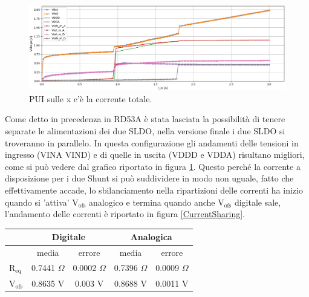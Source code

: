 \begin{figure}
\centering
\includegraphics[scale=.3]{Immagini/PUI}
\caption{PUI sulle x c'è la corrente totale.}
\label{PUI}
\end{figure}
Come detto in precedenza in RD53A è stata lasciata la possibilità di tenere separate le alimentazioni dei due SLDO, nella versione finale i due SLDO si troveranno in parallelo. 
In questa configurazione gli andamenti delle tensioni in ingresso (VINA VIND) e di quelle in uscita (VDDD e VDDA) risultano migliori, come si può vedere dal grafico riportato in figura \ref{PUI}. 
Questo perché la corrente a disposizione per i due Shunt si può suddividere in modo non uguale, fatto che effettivamente accade, lo sbilanciamento nella ripartizioni delle correnti ha inizio quando si 'attiva' $\mathrm{V_{ofs}}$ analogico e termina quando anche $\mathrm{V_{ofs}}$  digitale sale, l'andamento delle correnti è riportato in figura \ref{CurrentSharing}.
\begin{center}
\begin{tabular}{|l|c|c|c|c|}
\hline
 & \multicolumn{2}{c|}{Digitale} & \multicolumn{2}{c|}{Analogica} \\ \hline
 
& media & errore & media & errore \\ \hline

$\mathrm{R_{eq}}$ & 0.7441 $\Omega$ & 0.0002 $\Omega$& 0.7396 $\Omega$ & 0.0009 $\Omega$ \\ \hline
$\mathrm{V_{ofs}}$ & 0.8635 V& 0.003 V & 0.8688 V & 0.0011 V\\ \hline 
\end{tabular}
\end{center}

